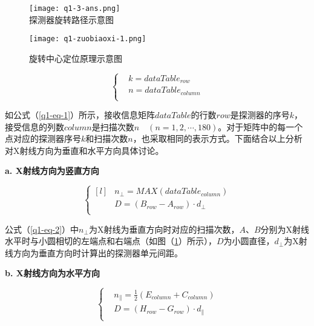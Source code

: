 \documentclass[withoutpreface,bwprint]{cumcmthesis} %
\begin{document}
\begin{figure}[!htbp]  
\begin{minipage}[t]{0.5\textwidth}
\centering  
\texttt{[image: q1-3-ans.png]} \\
\caption{探测器旋转路径示意图} \label{L1}
\end{minipage}
\hspace{1ex}
\begin{minipage}[t]{0.5\textwidth}  
\centering  
\texttt{[image: q1-zuobiaoxi-1.png]}\\
\caption{旋转中心定位原理示意图}  \label{L2}
\end{minipage}  
\end{figure} 

\begin{equation}
	\label{q1-eq-1}
	\left\{
	\begin{split}
		& k = dataTable_{row}\\
		& n = dataTable_{column}\\
	\end{split}
	\right.
\end{equation}
\par 如公式（\ref{q1-eq-1}）所示，接收信息矩阵$dataTable$的行数$row$是探测器的序号$k$，接受信息的列数$column$是扫描次数$n \quad (n = 1,2,\cdots,180)$。对于矩阵中的每一个点对应的探测器序号$k$和扫描次数$n$，也采取相同的表示方式。下面结合以上分析对X射线方向为垂直和水平方向具体讨论。

\textbf{a. X射线方向为竖直方向}


\begin{equation}
	\label{q1-eq-2}
	\left\{
	\begin{split}[l]
		& n_{\perp} = MAX(dataTable_{column})\\
		& D = (B_{row} - A_{row}) \cdot d_{\perp}\\ 
	\end{split}
	\right.
\end{equation}

公式（\ref{q1-eq-2}）中$n_{\perp}$为X射线为垂直方向时对应的扫描次数，$A$、$B$分别为X射线水平时与小圆相切的左端点和右端点（如图（\ref{L2}）所示），$D$为小圆直径，$d_{\perp}$为X射线方向为垂直方向时计算出的探测器单元间距。

\textbf{b. X射线方向为水平方向}

\begin{equation}
	\label{q1-eq-3}
	\left\{
	\begin{split}
	& n_{\parallel} = \frac{1}{2}(E_{column} + C_{column})\\
	& D = (H_{row} - G_{row}) \cdot d_{\parallel}\\ 	
	\end{split}
	\right.
\end{equation}
\end{document}
